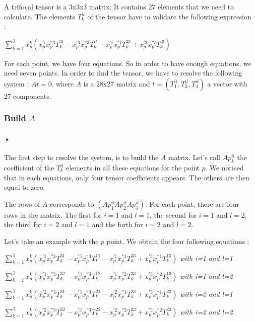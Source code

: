 \documentclass{report}
\begin{document}
A trifocal tensor is a 3x3x3 matrix. It contains 27 elements that we need to calculate. The elements $T_{k}^{il}$ of the tensor have to validate the following expression : 
\begin{center}
 $ \displaystyle { \sum_{k = 1}^{3}} x_{p}^{k}(x_{p}^{'i}x_{p}^{''3}T_{k}^{3l} - x_{p}^{'3}x_{p}^{''3}T_{k}^{il} - x_{p}^{'i}x_{p}^{''l}T_{k}^{33} + x_{p}^{'3}x_{p}^{''l}T_{k}^{i3})$ 
\end{center}
For each point, we have four equations. So in order to have enough equations, we need seven points. 
In order to find the tensor, we have to resolve the following system : $At = 0$, where $A$ is a 28x27 matrix and $t = ( T_{1}^{il}, T_{2}^{il}, T_{3}^{il})$ a vector with 27 components.

\subsubsection{Build $A$}
\paragraph{•}

The first step to resolve the system, is to build the $A$ matrix. Let's call $Ap_{k}^{il}$ the coefficient of the $T_{k}^{il}$ elements in all these equations for the point $p$. We noticed that in each equations, only four tensor coefficients appears. The others are then equal to zero. 

The rows of $A$ corresponds to $( Ap_{1}^{il}  Ap_{2}^{il}  Ap_{3}^{il} )$.
For each point, there are four rows in the matrix. The first for $i=1$ and $l=1$, the second for $i=1$ and $l=2$, the third for $i=2$ and $l=1$ and the forth for $i=2$ and $l=2$.

\newpage
Let's take an example with the $p$ point. 
We obtain the four following equations : 
\begin{center}
 $ \displaystyle { \sum_{k = 1}^{3}} x_{p}^{k}(x_{p}^{'1}x_{p}^{''3}T_{k}^{31} - x_{p}^{'3}x_{p}^{''3}T_{k}^{11} - x_{p}^{'1}x_{p}^{''1}T_{k}^{33} + x_{p}^{'3}x_{p}^{''1}T_{k}^{13})$  \textit{with i=1 and l=1}
\end{center}
\begin{center}
 $ \displaystyle { \sum_{k = 1}^{3}} x_{p}^{k}(x_{p}^{'1}x_{p}^{''3}T_{k}^{32} - x_{p}^{'3}x_{p}^{''3}T_{k}^{12} - x_{p}^{'1}x_{p}^{''2}T_{k}^{33} + x_{p}^{'3}x_{p}^{''2}T_{k}^{13})$  \textit{with i=1 and l=2} 
\end{center}
\begin{center}
 $ \displaystyle { \sum_{k = 1}^{3}} x_{p}^{k}(x_{p}^{'2}x_{p}^{''3}T_{k}^{31} - x_{p}^{'3}x_{p}^{''3}T_{k}^{21} - x_{p}^{'2}x_{p}^{''1}T_{k}^{33} + x_{p}^{'3}x_{p}^{''1}T_{k}^{23})$  \textit{with i=2 and l=1} 
\end{center}
\begin{center}
 $ \displaystyle { \sum_{k = 1}^{3}} x_{p}^{k}(x_{p}^{'2}x_{p}^{''3}T_{k}^{32} - x_{p}^{'3}x_{p}^{''3}T_{k}^{22} - x_{p}^{'2}x_{p}^{''2}T_{k}^{33} + x_{p}^{'3}x_{p}^{''2}T_{k}^{23})$  \textit{with i=2 and l=2} 
\end{center}
\end{document}

